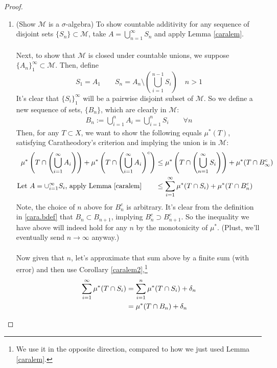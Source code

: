 \documentclass[12pt]{article}
\theoremstyle{plain}
\theoremstyle{definition}
\theoremstyle{remark}
\begin{document}
\begin{proof}
\begin{enumerate}
\item 
(Show $\mathscr{M}$ is a $\sigma$-algebra) To show countable additivity for any sequence of disjoint sets  $\{S_n\}\subset\mathscr{M}$, take $A=\bigcup^\infty_{n=1} S_n$ and apply Lemma \ref{caralem}.
\\
\\
Next, to show that $\mathscr{M}$ is closed under countable unions, we suppose $\{A_n\}_1^\infty \subset \mathscr{M}$.  Then, define 
\[
    S_1 = A_1 \qquad 
    S_n = A_n \setminus 
    \left(\bigcup^{n-1}_{i=1} S_{i}\right)
    \quad \text{$n>1$}
\]
It's clear that $\{S_i\}_{1}^\infty$ will be a pairwise disjoint subset of $\mathscr{M}$. So we define a new sequence of sets, $\{B_n\}$, which are clearly in $\mathscr{M}$:
\begin{align}
    \label{cara.bdef}
    B_n := \bigcup^n_{i=1} A_i = \bigcup^n_{i=1} S_i
    \qquad \forall n
\end{align}
Then, for any $T\subset X$, we want to show the following equals $\mu^*(T)$, satisfying Caratheodory's criterion and implying the union is in $\mathscr{M}$:
\begin{align}
    \mu^*\left(T \cap \left(\bigcup^\infty_{i=1} A_i
    \right)\right) + 
    \mu^*\left(T \cap \left(\bigcup^\infty_{i=1} A_i
    \right)^c\right) 
    &\leq 
    \mu^*\left(T \cap \left(\bigcup^\infty_{n=1} S_i
    \right)\right) + 
    \mu^*(T \cap B_\infty^c) \notag \\
    \text{Let $A=\cup^\infty_{i=1} S_i$, apply Lemma \ref{caralem}} \qquad 
    &\leq 
    \sum^\infty_{i=1}\mu^*(T\cap S_i) + 
    \mu^*(T \cap B_n^c) 
    \label{cara.chain}
\end{align}
Note, the choice of $n$ above for $B_n^c$ is arbitrary. It's clear from the definition in \ref{cara.bdef} that $B_n\subset B_{n+1}$, implying $B_n^c \supset B_{n+1}^c$. So the inequality we have above will indeed hold for any $n$ by the monotonicity of $\mu^*$. (Plust, we'll eventually send $n\rightarrow\infty$ anyway.)
\\
\\
Now given that $n$, let's approximate that sum above by a finite sum (with error) and then use Corollary \ref{caralem2},\footnote{We use it in the opposite direction, compared to how we just used Lemma \ref{caralem}.}
\begin{align}
    \label{cara.tosub}
    \sum^\infty_{i=1}\mu^*(T\cap S_i) &= 
    \sum^n_{i=1}\mu^*(T\cap S_i) + \delta_n \notag \\
    &= \mu^*(T\cap B_n) + \delta_n 
\end{align}

\end{enumerate}
\end{proof}
\end{document}
